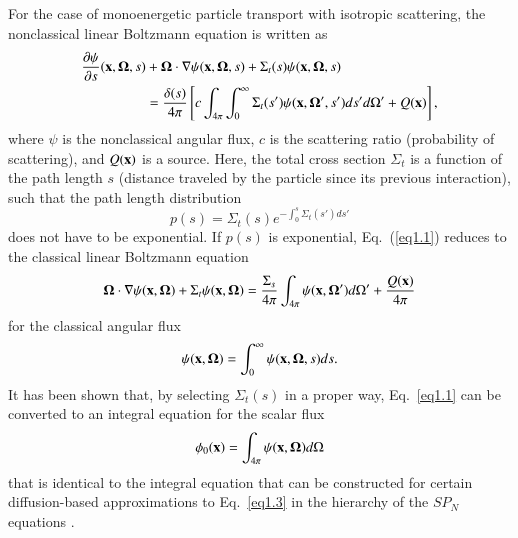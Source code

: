 \documentclass[preprint,12pt]{elsarticle}
\newcommand{\ux}{{\bf x}}
\newcommand{\uomega}{{\bf \Omega}}
\newcommand{\unabla}{{\bf \nabla}}
\begin{document}
For the case of monoenergetic particle transport with isotropic scattering, the nonclassical linear Boltzmann equation is written as
\begin{equation}
\label{eq1.1}
\begin{split}
\frac{\partial\psi}{\partial s}(\ux,\uomega,s) &+ \uomega\cdot\unabla \psi(\ux,\uomega,s) + \Sigma_t(s)\psi(\ux,\uomega,s)\\
&= \frac{\delta(s)}{4\pi}\left[ c\int_{4\pi}\int_0^\infty \Sigma_t(s')\psi(\ux,\uomega',s')ds' d\Omega' + Q(\ux) \right],
\end{split}
\end{equation}
where $\psi$ is the nonclassical angular flux, $c$ is the scattering ratio (probability of scattering), and $Q(\bf x)$ is a source. Here, the total cross section $\Sigma_t$ is a function of the path length $s$ (distance traveled by the particle since its previous interaction), such that the path length distribution  
\begin{equation}\label{eq1.2}
p(s) = \Sigma_t(s)e^{-\int_0^s \Sigma_t(s')ds'}
\end{equation}
does not have to be exponential. If $p(s)$ is exponential, Eq.\ (\ref{eq1.1}) reduces to the classical linear Boltzmann equation
\begin{equation}
\label{eq1.3}
\uomega\cdot\unabla \psi(\ux,\uomega) + \Sigma_t \psi(\ux,\uomega) = \frac{\Sigma_s}{4\pi}\int_{4\pi}\psi(\ux,\uomega')d\Omega'+ \frac{Q(\ux)}{4\pi}
\end{equation}
for the classical angular flux 
\begin{equation}
\label{eq1.4}
\psi(\ux,\uomega) = \int_0^\infty \psi(\ux,\uomega,s)ds.
\end{equation} 
It has been shown \cite{siap15} that, by selecting $\Sigma_t(s)$ in a proper way, Eq.\ \eqref{eq1.1} can be converted to an integral equation for the scalar flux
\begin{equation}
\label{eq1.5}
\phi_0(\ux) = \int_{4\pi} \psi(\ux,\uomega)d\Omega
\end{equation}
that is identical to the integral equation that can be constructed for certain diffusion-based approximations to Eq.\ \eqref{eq1.3} in the hierarchy of the $SP_N$ equations \cite{mcclarren_11}.
\end{document}

